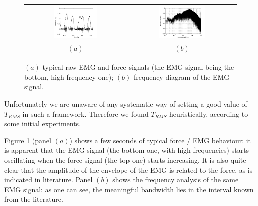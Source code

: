 \begin{figure}[!ht] \centering
  \begin{tabular}{cc}
    \includegraphics[width=0.45\textwidth]{figs/force_raw} &
    \includegraphics[width=0.45\textwidth]{figs/spectrum_raw} \\
    $(a)$ & $(b)$ \\
  \end{tabular}
  \caption{$(a)$ typical raw EMG and force signals (the EMG signal
    being the bottom, high-frequency one); $(b)$ frequency diagram of
    the EMG signal.}
  \label{fig:spectra}
\end{figure}


Unfortunately we are unaware of any systematic way of setting a good value of $T_{RMS}$ in such a framework. Therefore we found $T_{RMS}$ heuristically, according to some initial experiments.

Figure \ref{fig:spectra} (panel $(a)$) shows a few seconds of typical force / EMG behaviour: it is apparent that the EMG signal (the bottom one, with high frequencies) starts oscillating when the force signal (the top one) starts increasing. It is also quite clear that the amplitude of the envelope of the EMG is related to the force, as is indicated in literature. Panel $(b)$ shows the frequency analysis of the same EMG signal: as one can see, the meaningful bandwidth lies in the interval known from the literature.

